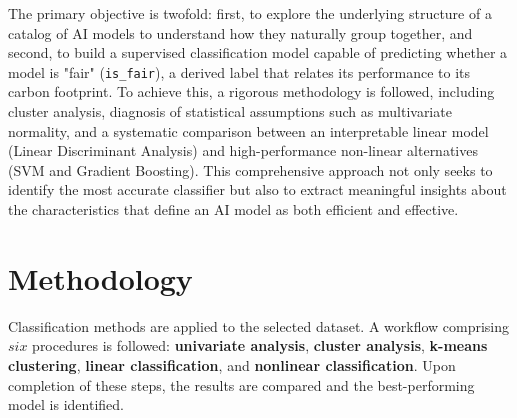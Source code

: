 \documentclass[journal]{IEEEtran}
\begin{document}
The primary objective is twofold: first, to explore the underlying structure of a catalog of AI models to understand how they naturally group together, and second, to build a supervised classification model capable of predicting whether a model is "fair" (\texttt{is\_fair}), a derived label that relates its performance to its carbon footprint. To achieve this, a rigorous methodology is followed, including cluster analysis, diagnosis of statistical assumptions such as multivariate normality, and a systematic comparison between an interpretable linear model (Linear Discriminant Analysis) and high-performance non-linear alternatives (SVM and Gradient Boosting). This comprehensive approach not only seeks to identify the most accurate classifier but also to extract meaningful insights about the characteristics that define an AI model as both efficient and effective.


	\section{Methodology}
	\label{sec:methodology}
	Classification methods are applied to the selected dataset. A workflow comprising $six$ procedures is followed: \textbf{univariate analysis}, \textbf{cluster analysis}, \textbf{k-means clustering}, \textbf{linear classification}, and \textbf{nonlinear classification}. Upon completion of these steps, the results are compared and the best-performing model is identified.
\end{document}
